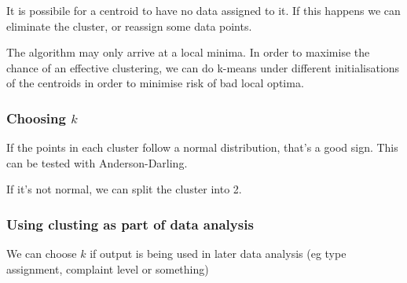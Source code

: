 It is possibile for a centroid to have no data assigned to it. If this happens we can eliminate the cluster, or reassign some data points.

The algorithm may only arrive at a local minima. In order to maximise the chance of an effective clustering, we can do k-means under different initialisations of the centroids in order to minimise risk of bad local optima.

\subsubsection{Choosing \(k\)}

If the points in each cluster follow a normal distribution, that's a good sign. This can be tested with Anderson-Darling.

If it's not normal, we can split the cluster into 2.

\subsubsection{Using clusting as part of data analysis}

We can choose \(k\) if output is being used in later data analysis (eg type assignment, complaint level or something)

